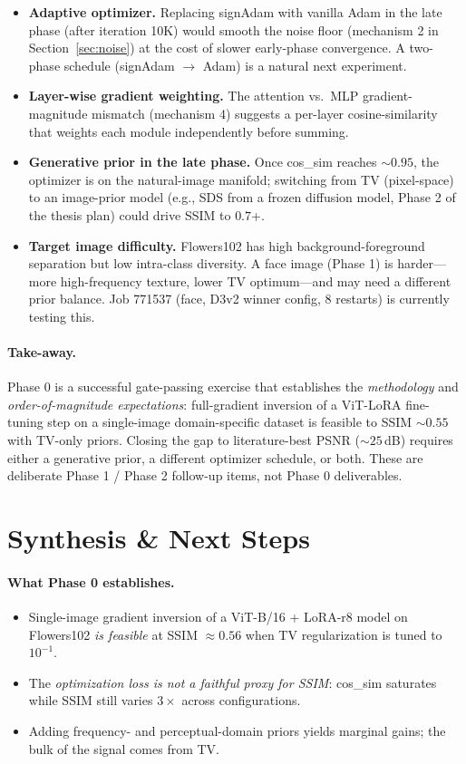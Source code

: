 \documentclass[11pt,a4paper]{article}
\begin{document}
\begin{itemize}
  \item \textbf{Adaptive optimizer.} Replacing signAdam with vanilla Adam in the late phase (after iteration 10K) would smooth the noise floor (mechanism 2 in Section~\ref{sec:noise}) at the cost of slower early-phase convergence. A two-phase schedule (signAdam $\to$ Adam) is a natural next experiment.
  \item \textbf{Layer-wise gradient weighting.} The attention vs.\ MLP gradient-magnitude mismatch (mechanism 4) suggests a per-layer cosine-similarity that weights each module independently before summing.
  \item \textbf{Generative prior in the late phase.} Once cos\_sim reaches $\sim 0.95$, the optimizer is on the natural-image manifold; switching from TV (pixel-space) to an image-prior model (e.g., SDS from a frozen diffusion model, Phase 2 of the thesis plan) could drive SSIM to $0.7$+.
  \item \textbf{Target image difficulty.} Flowers102 has high background-foreground separation but low intra-class diversity. A face image (Phase 1) is harder---more high-frequency texture, lower TV optimum---and may need a different prior balance. Job 771537 (face, D3v2 winner config, 8 restarts) is currently testing this.
\end{itemize}

\paragraph{Take-away.} Phase 0 is a successful gate-passing exercise that establishes the \emph{methodology} and \emph{order-of-magnitude expectations}: full-gradient inversion of a ViT-LoRA fine-tuning step on a single-image domain-specific dataset is feasible to SSIM $\sim 0.55$ with TV-only priors. Closing the gap to literature-best PSNR ($\sim 25$\,dB) requires either a generative prior, a different optimizer schedule, or both. These are deliberate Phase 1 / Phase 2 follow-up items, not Phase 0 deliverables.

\section{Synthesis \& Next Steps}
\label{sec:next}

\paragraph{What Phase 0 establishes.}
\begin{itemize}
  \item Single-image gradient inversion of a ViT-B/16 + LoRA-r8 model on Flowers102 \emph{is feasible} at SSIM $\approx 0.56$ when TV regularization is tuned to $10^{-1}$.
  \item The \emph{optimization loss is not a faithful proxy for SSIM}: cos\_sim saturates while SSIM still varies $3\times$ across configurations.
  \item Adding frequency- and perceptual-domain priors yields marginal gains; the bulk of the signal comes from TV.
\end{itemize}
\end{document}
